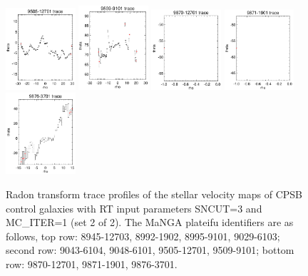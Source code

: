 \documentclass[fleqn,usenatbib]{mnras}
\begin{document}
\begin{figure}
    \includegraphics[width=0.23\textwidth]{Images/SN1-MC250/CPSB-CTRLs/9505-12701-1-250.png}   
    \includegraphics[width=0.23\textwidth]{Images/SN1-MC250/CPSB-CTRLs/9509-9101-1-250.png}
    \includegraphics[width=0.23\textwidth]{Images/SN1-MC250/CPSB-CTRLs/9870-12701-1-250.png}
    \includegraphics[width=0.23\textwidth]{Images/SN1-MC250/CPSB-CTRLs/9871-1901-1-250.png}    
    \includegraphics[width=0.23\textwidth]{Images/SN1-MC250/CPSB-CTRLs/9876-3701-1-250.png}
    \caption{Radon transform trace profiles of the stellar velocity maps of CPSB control galaxies with RT input parameters SNCUT=3 and MC\_ITER=1 (set 2 of 2). The MaNGA plateifu identifiers are as follows, top row: 8945-12703, 8992-1902, 8995-9101, 9029-6103; second row: 9043-6104, 9048-6101, 9505-12701, 9509-9101; bottom row: 9870-12701, 9871-1901, 9876-3701.}
    \label{fig:Radon-traces-CPSB-controls-2-SN1-MC250}
\end{figure}
\end{document}
